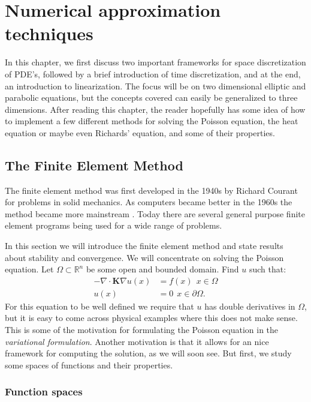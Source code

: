 \documentclass[../Main/main.tex]{subfiles}
\begin{document}
	\graphicspath{{../Discretization/figs/}}
	\chapter{Numerical approximation techniques}
	In this chapter, we first discuss two important frameworks for space discretization of PDE's, followed by a brief introduction of time discretization, and at the end, an introduction to linearization. The focus will be on two dimensional elliptic and parabolic equations, but the concepts covered can easily be generalized to three dimensions. After reading this chapter, the reader hopefully has some idea of how to implement a few different methods for solving the Poisson equation, the heat equation or maybe even Richards' equation, and some of their properties. 
	\section{The Finite Element Method}\label{sec:fem}

	The finite element method was first developed in the 1940s by Richard Courant for problems in solid mechanics. As computers became better in the 1960s the method became  more mainstream \cite{Stein2014}. Today there are several general purpose finite element programs being used for a wide range of problems.\par
	In this section we will introduce the finite element method and state results about stability and convergence.
	We will concentrate on solving the Poisson equation. Let $\Omega \subset \mathbb{R}^n$ be some open and bounded domain. Find $u$ such that:
	\begin{equation} \label{eq:poisson}
		\begin{split}
			-\nabla \cdot \bm{K} \nabla u(x) &= f(x) \ \  x\in \Omega \\ 
			u(x) &= 0 \ \ x\in \partial \Omega.
		\end{split}
	\end{equation}
	For this equation to be well defined we require that $u$ has double derivatives in $\Omega$, but it is easy to come across physical examples where this does not make sense.
	This is some of the motivation for formulating the Poisson equation in the \emph{variational formulation}. Another motivation is that it allows for an nice framework for computing the solution, as we will soon see. But first, we study some spaces of functions and their properties.
	
	
	\subsection{Function spaces}
\end{document}
